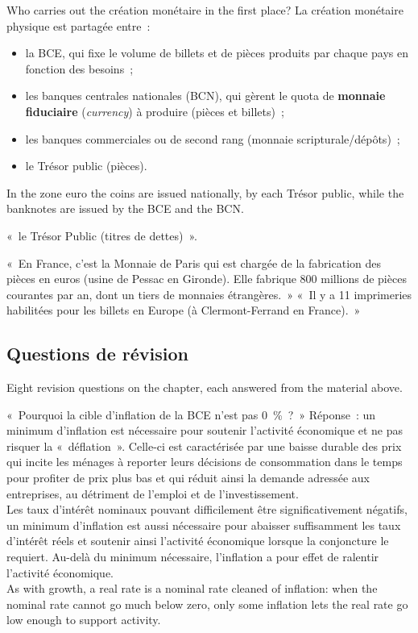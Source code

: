 Who carries out the création monétaire in the first place? La création
monétaire physique est partagée entre~:
\begin{itemize}
  \item la BCE, qui fixe le volume de billets et de pièces produits par chaque
    pays en fonction des besoins~;
  \item les banques centrales nationales (BCN), qui gèrent le quota de
    \textbf{monnaie fiduciaire} (\textit{currency}) à produire (pièces et
    billets)~;
  \item les banques commerciales ou de second rang (monnaie scripturale/dépôts)~;
  \item le Trésor public (pièces).
\end{itemize}
In the zone euro the coins are issued nationally, by each Trésor public, while
the banknotes are issued by the BCE and the BCN.

\begin{remark}
  «~le Trésor Public (titres de dettes)~».
\end{remark}

«~En France, c'est la Monnaie de Paris qui est chargée de la fabrication des
pièces en euros (usine de Pessac en Gironde). Elle fabrique 800 millions de
pièces courantes par an, dont un tiers de monnaies étrangères.~» «~Il y a 11
imprimeries habilitées pour les billets en Europe (à Clermont-Ferrand en
France).~»

\subsection{Questions de révision}

Eight revision questions on the chapter, each answered from the material above.

\begin{example}
  «~Pourquoi la cible d'inflation de la BCE n'est pas 0~\%~?~» Réponse~: un
  minimum d'inflation est nécessaire pour soutenir l'activité économique et ne
  pas risquer la «~déflation~». Celle-ci est caractérisée par une baisse durable
  des prix qui incite les ménages à reporter leurs décisions de consommation dans
  le temps pour profiter de prix plus bas et qui réduit ainsi la demande adressée
  aux entreprises, au détriment de l'emploi et de l'investissement.\\
  Les taux d'intérêt nominaux pouvant difficilement être significativement
  négatifs, un minimum d'inflation est aussi nécessaire pour abaisser
  suffisamment les taux d'intérêt réels et soutenir ainsi l'activité économique
  lorsque la conjoncture le requiert. Au-delà du minimum nécessaire, l'inflation
  a pour effet de ralentir l'activité économique.\\
  As with growth, a real rate is a nominal rate cleaned of inflation: when the
  nominal rate cannot go much below zero, only some inflation lets the real rate
  go low enough to support activity.
\end{example}

